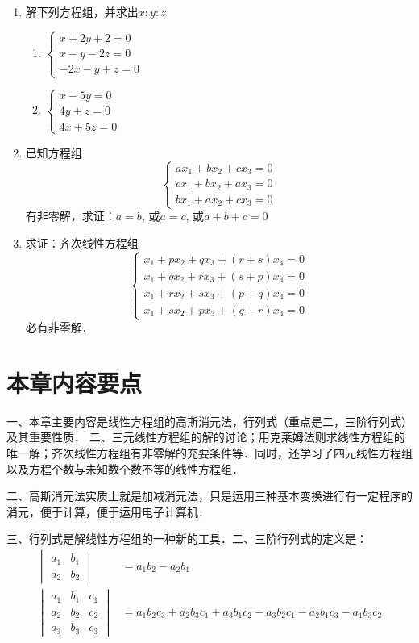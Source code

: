 \begin{enumerate}
\item 解下列方程组，并求出$x:y:z$
\begin{multicols}{2}
    \begin{enumerate}
\item $\begin{cases}
    x+2y+2=0\\x-y-2z=0\\-2x-y+z=0
\end{cases}$
\item $\begin{cases}
    x-5y=0\\
4y+z=0\\
4x+5z=0
\end{cases}$
    \end{enumerate}
\end{multicols}
\item 已知方程组
\[\begin{cases}
 ax_1+bx_2+cx_3=0 \\ cx_1+bx_2+ax_3=0 \\ bx_1 +ax_2+cx_3=0   
\end{cases}\]
有非零解，求证：$a=b$, 或$a=c$, 或$a+b+c=0$

\item 求证：齐次线性方程组
\[\begin{cases}
  x_1+px_2+qx_3+ (r+s) x_4=0\\
  x_1+qx_2+rx_3+ (s+p) x_4=0\\
  x_1+rx_2+sx_3+ (p+q) x_4=0\\
  x_1+sx_2+px_3+ (q+r) x_4=0 
\end{cases}\]
必有非零解．
\end{enumerate}

\section*{本章内容要点}
一、本章主要内容是线性方程组的高斯消元法，行列式（重点是二，三阶行列式）及其重要性质．
二、三元线性方程组的解的讨论；用克莱姆法则求线性方程组的唯一解；齐次线性方程组有非零解的充要条件等．同时，还学习了四元线性方程组以及方程个数与未知数个数不等的线性方程组．

二、高斯消元法实质上就是加减消元法，只是运用三种基本变换进行有一定程序的消元，便于计算，便于运用电子计算机．

三、行列式是解线性方程组的一种新的工具．二、三阶行列式的定义是：
\[\begin{split}
\begin{vmatrix}
    a_1&b_1\\a_2&b_2
\end{vmatrix}&=a_1b_2-a_2b_1\\
\begin{vmatrix}
    a_1&b_1&c_1\\a_2&b_2&c_2\\a_3&b_3&c_3
\end{vmatrix}&=a_1b_2c_3+a_2b_3c_1+a_3b_1c_2
-a_3b_2c_1-a_2b_1c_3-a_1b_3c_2
\end{split}\]

